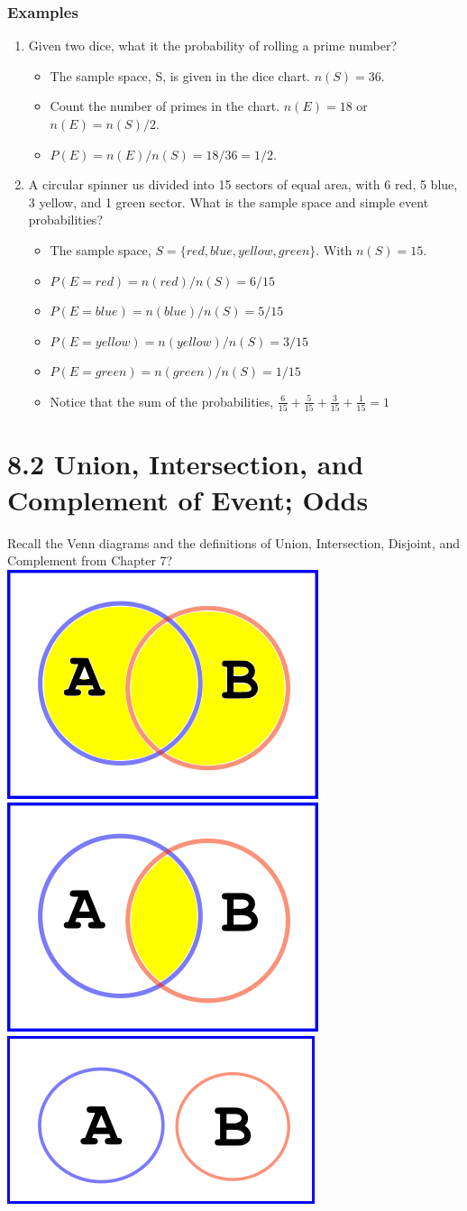 \documentclass[14pt]{extarticle}
\begin{document}
\subsubsection{Examples}
\begin{enumerate}
	\item Given two dice, what it the probability of rolling a prime number?
	\begin{itemize}
		\item The sample space, S, is given in the dice chart. $n(S)=36$.
		\item Count the number of primes in the chart. $n(E)=18$ or $n(E)=n(S)/2$.
		\item $P(E) = n(E)/n(S)= 18/36 = 1/2$.
	\end{itemize}
	\item A circular spinner us divided into 15 sectors of equal area, with 6 red, 5 blue, 3 yellow, and 1 green sector. What is the sample space and simple event probabilities?
	\begin{itemize}
		\item The sample space, $S= \{red, blue, yellow, green\}$. With $n(S)=15$.
		\item $P(E =  red) = n(red)/n(S)= 6/15$
		\item $P(E =  blue) = n(blue)/n(S)= 5/15$
		\item $P(E =  yellow) = n(yellow)/n(S)= 3/15$
		\item $P(E =  green) = n(green)/n(S)= 1/15$
		\item Notice that the sum of the probabilities, $\frac{6}{15}+\frac{5}{15}+\frac{3}{15}+\frac{1}{15} = 1$
	\end{itemize}
\end{enumerate}



\section*{8.2 Union, Intersection, and Complement of Event; Odds}
Recall the Venn diagrams and the definitions of Union, Intersection, Disjoint, and Complement from Chapter 7?
\\
\includegraphics[width=0.3\linewidth]{union}\includegraphics[width=0.3\linewidth]{intersect}
\includegraphics[width=0.3\linewidth]{disjoint}
\\
\end{document}
